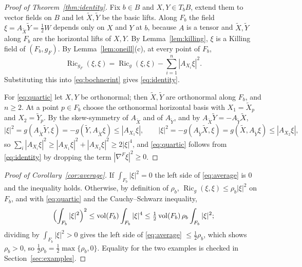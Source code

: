 \documentclass[11pt,reqno]{amsart}
\theoremstyle{plain}
\theoremstyle{definition}
\newcommand{\Ric}{\operatorname{Ric}}
\newcommand{\vol}{\operatorname{vol}}
\newcommand{\bas}[1]{\widetilde{#1}}
\begin{document}
\begin{proof}[Proof of Theorem~\ref{thm:identity}]
Fix $b\in B$ and $X,Y\in T_bB$, extend them to vector fields on $B$ and let $\bas X,\bas Y$ be the basic lifts. Along $F_b$ the field $\xi=A_{\bas X}\bas Y=\tfrac12 W$ depends only on $X$ and $Y$ at $b$, because $A$ is a tensor and $\bas X,\bas Y$ along $F_b$ are the horizontal lifts of $X,Y$. By Lemma~\ref{lem:killing}, $\xi$ is a Killing field of $(F_b,g_F)$. By Lemma~\ref{lem:oneill}(c), at every point of $F_b$,
\begin{equation}
\Ric_{g_F}(\xi,\xi)=\Ric_g(\xi,\xi)-\sum_{i=1}^n|A_{X_i}\xi|^2 .
\end{equation}
Substituting this into \eqref{eq:bochnerint} gives \eqref{eq:identity}.

For \eqref{eq:quartic} let $X,Y$ be orthonormal; then $\bas X,\bas Y$ are orthonormal along $F_b$, and $n\ge2$. At a point $p\in F_b$ choose the orthonormal horizontal basis with $X_1=\bas X_p$ and $X_2=\bas Y_p$. By the skew-symmetry of $A_{\bas X}$ and of $A_{\bas Y}$, and by $A_{\bas X}\bas Y=-A_{\bas Y}\bas X$,
\begin{equation}
|\xi|^2=g(A_{\bas X}\bas Y,\xi)=-g(\bas Y,A_{\bas X}\xi)\le|A_{X_1}\xi|,\qquad
|\xi|^2=-g(A_{\bas Y}\bas X,\xi)=g(\bas X,A_{\bas Y}\xi)\le|A_{X_2}\xi| ,
\end{equation}
so $\sum_i|A_{X_i}\xi|^2\ge|A_{X_1}\xi|^2+|A_{X_2}\xi|^2\ge2|\xi|^4$, and \eqref{eq:quartic} follows from \eqref{eq:identity} by dropping the term $|\nabla^F\xi|^2\ge0$.
\end{proof}

\begin{proof}[Proof of Corollary~\ref{cor:average}]
If $\int_{F_b}|\xi|^2=0$ the left side of \eqref{eq:average} is $0$ and the inequality holds. Otherwise, by definition of $\rho_b$, $\Ric_g(\xi,\xi)\le\rho_b|\xi|^2$ on $F_b$, and with \eqref{eq:quartic} and the Cauchy--Schwarz inequality,
\begin{equation}
\Bigl(\int_{F_b}|\xi|^2\Bigr)^2\le\vol(F_b)\int_{F_b}|\xi|^4\le\tfrac12\vol(F_b)\,\rho_b\int_{F_b}|\xi|^2 ;
\end{equation}
dividing by $\int_{F_b}|\xi|^2>0$ gives the left side of \eqref{eq:average} $\le\tfrac12\rho_b$, which shows $\rho_b>0$, so $\tfrac12\rho_b=\tfrac12\max\{\rho_b,0\}$. Equality for the two examples is checked in Section~\ref{sec:examples}.
\end{proof}
\end{document}
